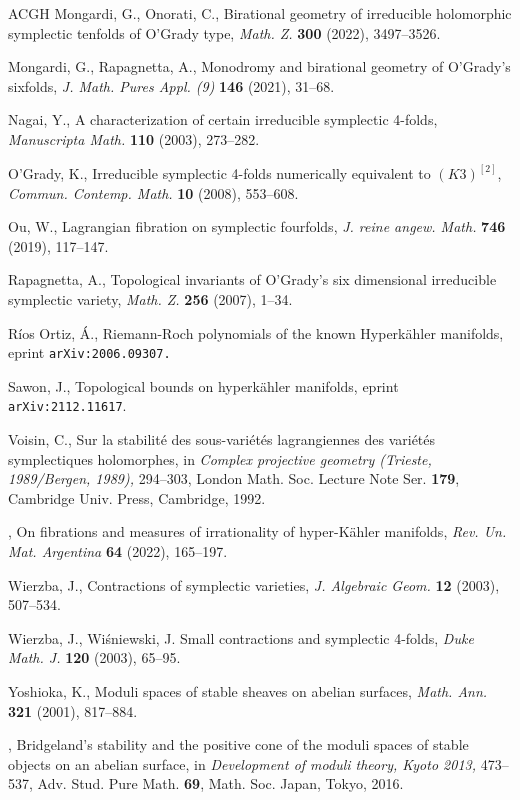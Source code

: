 \documentclass[12pt]{amsart}
\theoremstyle{remark}
\begin{document}
\begin{thebibliography}{ACGH}
 Mongardi, G., Onorati, C., Birational geometry of irreducible holomorphic symplectic tenfolds of O'Grady type, {\em Math. Z.} {\bf 300} (2022), 3497--3526.

 Mongardi, G., Rapagnetta, A., Monodromy and birational geometry of O'Grady's sixfolds, {\em J. Math. Pures Appl. (9)} {\bf 146} (2021), 31--68.

 Nagai, Y., A characterization of certain irreducible symplectic 4-folds, {\it Manuscripta Math.} {\bf 110} (2003), 273--282.

 O'Grady,  K., Irreducible symplectic 4-folds numerically equivalent to $(K3)^{[2]}$, {\it Commun. Contemp. Math.}  {\bf10} (2008), 553--608.

 Ou, W., Lagrangian fibration on symplectic fourfolds, {\em J. reine angew. Math.} {\bf 746} (2019), 117--147.

 Rapagnetta, A., Topological invariants of O'Grady's six dimensional irreducible symplectic variety, {\em Math. Z.}  {\bf256} (2007), 1--34.


 R\'ios Ortiz, \'A., Riemann-Roch polynomials of the known Hyperk\"ahler manifolds, eprint {\tt arXiv:2006.09307.}



 Sawon, J., Topological bounds on hyperk\"ahler manifolds, eprint {\tt arXiv:2112.11617}.

  Voisin, C., Sur la stabilit\'e des sous-vari\'et\'es lagrangiennes des vari\'et\'es symplectiques holomorphes, in {\it Complex projective geometry (Trieste, 1989/Bergen, 1989),} 294--303, London Math. Soc. Lecture Note Ser. {\bf179}, Cambridge Univ. Press, Cambridge, 1992.

 \bysame, On fibrations and measures of irrationality of hyper-K\"ahler manifolds, {\it Rev. Un. Mat. Argentina} {\bf 64} (2022), 165--197.

 Wierzba, J.,  Contractions of symplectic varieties, {\it J. Algebraic Geom.}  {\bf12} (2003), 507--534.

 Wierzba, J., Wi\'sniewski, J. Small contractions and symplectic 4-folds, {\em Duke Math. J.} {\bf 120} (2003), 65--95.

 Yoshioka, K., Moduli spaces of stable sheaves on abelian surfaces, {\em Math. Ann.} {\bf 321} (2001), 817--884.

 \bysame, Bridgeland's stability and the positive cone of the moduli spaces of stable objects on an abelian surface, in {\em Development of moduli theory, Kyoto 2013,} 473--537, Adv. Stud. Pure Math. {\bf69}, Math. Soc. Japan, Tokyo, 2016.

\end{thebibliography}
\end{document}
